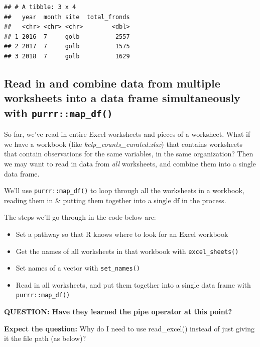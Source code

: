 \documentclass[]{book}
\providecommand{\tightlist}{%
  \setlength{\itemsep}{0pt}\setlength{\parskip}{0pt}}
\begin{document}
\begin{verbatim}
## # A tibble: 3 x 4
##   year  month site  total_fronds
##   <chr> <chr> <chr>        <dbl>
## 1 2016  7     golb          2557
## 2 2017  7     golb          1575
## 3 2018  7     golb          1629
\end{verbatim}

\hypertarget{read-in-and-combine-data-from-multiple-worksheets-into-a-data-frame-simultaneously-with-purrrmap_df}{%
\subsection{\texorpdfstring{Read in and combine data from multiple worksheets into a data frame simultaneously with \texttt{purrr::map\_df()}}{Read in and combine data from multiple worksheets into a data frame simultaneously with purrr::map\_df()}}\label{read-in-and-combine-data-from-multiple-worksheets-into-a-data-frame-simultaneously-with-purrrmap_df}}

So far, we've read in entire Excel worksheets and pieces of a worksheet. What if we have a workbook (like \emph{kelp\_counts\_curated.xlsx}) that contains worksheets that contain observations for the same variables, in the same organization? Then we may want to read in data from \emph{all} worksheets, and combine them into a single data frame.

We'll use \texttt{purrr::map\_df()} to loop through all the worksheets in a workbook, reading them in \& putting them together into a single df in the process.

The steps we'll go through in the code below are:

\begin{itemize}
\tightlist
\item
  Set a pathway so that R knows where to look for an Excel workbook
\item
  Get the names of all worksheets in that workbook with \texttt{excel\_sheets()}
\item
  Set names of a vector with \texttt{set\_names()}
\item
  Read in all worksheets, and put them together into a single data frame with \texttt{purrr::map\_df()}
\end{itemize}

\textbf{QUESTION: Have they learned the pipe operator at this point?}

\textbf{Expect the question:} Why do I need to use read\_excel() instead of just giving it the file path (as below)?
\end{document}
